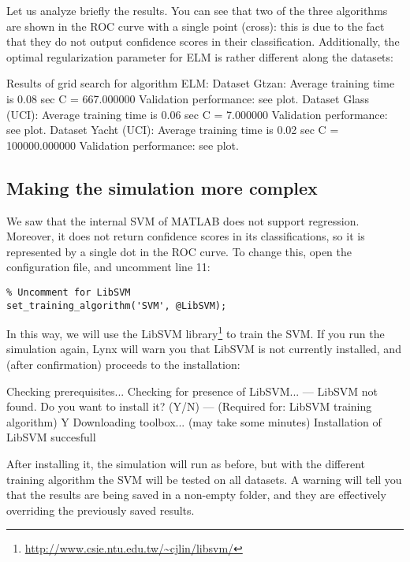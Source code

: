 Let us analyze briefly the results. You can see that two of the three algorithms are shown in the ROC curve with a single point (cross): this is due to the fact that they do not output confidence scores in their classification. Additionally, the optimal regularization parameter for ELM is rather different along the datasets:

\begin{console}
Results of grid search for algorithm ELM: 
   Dataset Gtzan:
      Average training time is 0.08 sec
      C = 667.000000
      Validation performance: see plot.
   Dataset Glass (UCI):
      Average training time is 0.06 sec
      C = 7.000000
      Validation performance: see plot.
   Dataset Yacht (UCI):
      Average training time is 0.02 sec
      C = 100000.000000
      Validation performance: see plot.
\end{console}

\subsection{Making the simulation more complex}

We saw that the internal SVM of MATLAB does not support regression. Moreover, it does not return confidence scores in its classifications, so it is represented by a single dot in the ROC curve. To change this, open the configuration file, and uncomment line 11:

\begin{lstlisting}
% Uncomment for LibSVM
set_training_algorithm('SVM', @LibSVM); 
\end{lstlisting}

\noindent In this way, we will use the LibSVM library\footnote{\url{http://www.csie.ntu.edu.tw/~cjlin/libsvm/}} to train the SVM. If you run the simulation again, Lynx will warn you that LibSVM is not currently installed, and (after confirmation) proceeds to the installation:

\begin{console}
Checking prerequisites...
Checking for presence of LibSVM...
--- LibSVM not found. Do you want to install it? (Y/N) ---
(Required for: LibSVM training algorithm)
Y
Downloading toolbox... (may take some minutes)
Installation of LibSVM succesfull
\end{console}

\noindent After installing it, the simulation will run as before, but with the different training algorithm the SVM will be tested on all datasets. A warning will tell you that the results are being saved in a non-empty folder, and they are effectively overriding the previously saved results.

